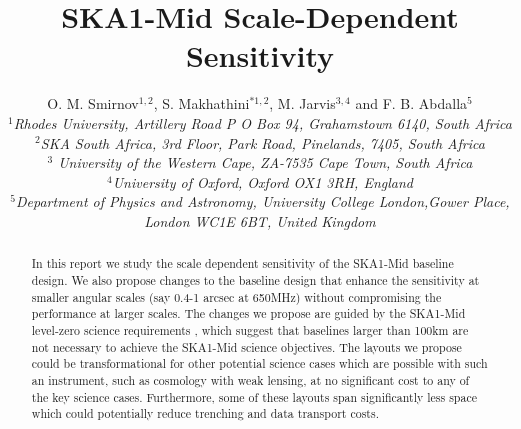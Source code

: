 \documentclass[sfheadings,a4paper,times,9pt,floats,floatfix]{article}
\title{SKA1-Mid Scale-Dependent Sensitivity}
\author{O. M. Smirnov$^{1,2}$, S. Makhathini$^{*1,2}$, M. Jarvis$^{3,4}$ and F. B. Abdalla$^5$ \\{\footnotesize \it $^1$Rhodes
University, Artillery Road P O Box 94, Grahamstown 6140, South Africa} \\{ \footnotesize \it $^2$SKA South Africa, 3rd Floor,
Park Road, Pinelands, 7405, South Africa} \\{\footnotesize \it $^3$ University of the Western Cape, ZA-7535 Cape Town, South
Africa}\\ {\footnotesize \it $^4$University of Oxford, Oxford OX1 3RH, England} \\ {\footnotesize \it $^5$Department of Physics
and Astronomy, University College London,Gower Place, London WC1E 6BT, United Kingdom}}
\date{}
\begin{document}
\maketitle

\begin{abstract}
 In this report we study the scale dependent sensitivity of the SKA1-Mid baseline design. We also propose changes to the baseline
design that enhance the sensitivity at smaller angular scales (say 0.4-1 arcsec at 650MHz) without compromising the performance at
larger scales. The changes we propose are guided by the SKA1-Mid level-zero science requirements \cite{srd}, which suggest that
baselines larger than 100km are not necessary to achieve the SKA1-Mid science objectives. The layouts we propose could be
transformational for other potential science cases which are possible with such an instrument, such as cosmology with weak
lensing, at no significant cost to any of the key science cases. Furthermore, some of these layouts span significantly less space
which could potentially reduce trenching and data transport costs.
\end{abstract}
\end{document}
